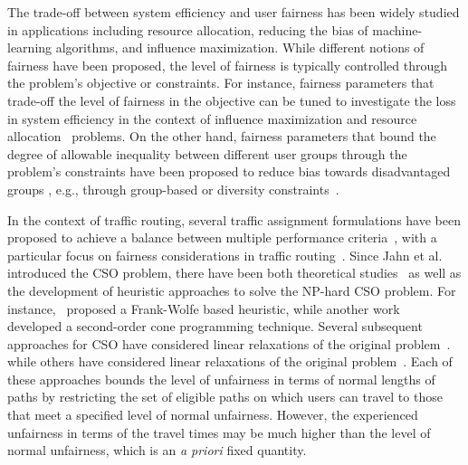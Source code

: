 \documentclass{article}
\newif\ifarxiv   %
\begin{document}
The trade-off between system efficiency and user fairness has been widely studied in applications including resource allocation, reducing the bias of machine-learning algorithms, and influence maximization. While different notions of fairness have been proposed, %
the level of fairness is typically controlled through the problem's objective or constraints. For instance, fairness parameters that trade-off the level of fairness in the objective can be tuned to investigate the loss in system efficiency in the context of influence maximization \cite{Rahmattalabi2020FairIM} and resource allocation~\cite{Bertsimas-Eff-Fairness} problems. On the other hand, fairness parameters that bound the degree of allowable inequality between different user groups through the problem's constraints have been proposed to reduce bias towards disadvantaged groups \cite{stoica-seeding}\ifarxiv. For example, group-based fairness notions \cite{yiling-fair-classification} have been studied to reduce the bias of machine-learning algorithms, and diversity constraints have been introduced to ensure that the benefits of social interventions are fairly distributed \cite{Tsang2019GroupFairnessII}. \else, e.g., through group-based or diversity constraints~\cite{yiling-fair-classification,Tsang2019GroupFairnessII}. \fi

In the context of traffic routing, several traffic assignment formulations have been proposed to achieve a balance between multiple performance criteria~\cite{DIAL1996,DIAL1997357}, with a particular focus on fairness considerations in traffic routing~\cite{so-routing-seminal}. Since Jahn et al. \cite{so-routing-seminal} introduced the CSO problem, there have been both theoretical studies~\cite{so-routing-user-constraints} as well as the development of heuristic approaches to solve the NP-hard CSO problem. For instance,~\cite{so-routing-seminal} proposed a Frank-Wolfe based heuristic, \ifarxiv wherein the solution to the linearized CSO problem is obtained by solving a constrained shortest-path problem, \fi \ifarxiv while another work~\cite{BAYRAM2015146} developed a second-order cone programming technique. Several subsequent approaches for CSO have considered linear relaxations of the original problem~\cite{ANGELELLI20161,ANGELELLI2020,ANGELELLI2018234}. \else while others have considered linear relaxations of the original problem~\cite{ANGELELLI20161,ANGELELLI2018234,ANGELELLI2020}. \fi Each of these approaches bounds the level of unfairness in terms of normal lengths of paths by restricting the set of eligible paths on which users can travel to those that meet a specified level of normal unfairness. However, the experienced unfairness in terms of the travel times \ifarxiv on the restricted path set \fi may be much higher than the \ifarxiv specified \fi level of normal unfairness, which is an \emph{a priori} fixed quantity. 
\end{document}
